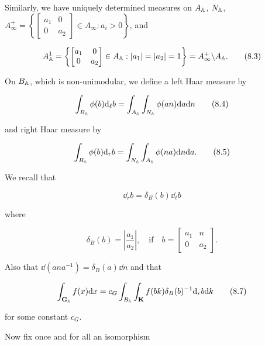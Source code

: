 Similarly, we have uniquely determined measures on $A_{\mathbb{A}}$, $N_{\mathbb{A}}$, $A_{\infty}^{+} = \left\{\begin{bmatrix} a_{1} & 0 \\ 0 & a_{2} \end{bmatrix} \in A_{\infty}: a_{i} > 0\right\}$, and

\begin{equation}\label{eq:8.3}
A_{\mathbb{A}}^{1} = \left\{\begin{bmatrix} a_{1} & 0 \\ 0 & a_{2} \end{bmatrix} \in A_{\mathbb{A}}: |a_{1}| = |a_{2}| = 1\right\} = A_{\infty}^{+}\backslash A_{\mathbb{A}}.\tag{8.3}
\end{equation}

On $B_{\mathbb{A}}$, which is non-unimodular, we define a left Haar measure by

\begin{equation}\label{eq:8.4}
\int_{B_{\mathbb{A}}} \phi(b) \mathrm{d}_{\ell} b = \int_{A_{\mathbb{A}}} \int_{N_{\mathbb{A}}} \phi(an) \mathrm{d} a \mathrm{d} n\tag{8.4}
\end{equation}

and right Haar measure by

\begin{equation}\label{eq:8.5}
\int_{B_{\mathbb{A}}} \phi(b) \mathrm{d}_{r} b = \int_{N_{\mathbb{A}}} \int_{A_{\mathbb{A}}} \phi(na) \mathrm{d} n \mathrm{d} a.\tag{8.5}
\end{equation}

We recall that

\begin{equation}\label{eq:8.6}
\dd_{r} b = \delta_{B}(b) \dd_{\ell} b\tag{8.6}
\end{equation}

where

\[
\delta_{B}(b) = \left|\frac{a_{1}}{a_{2}}\right|, \quad \text{if} \quad b = \begin{bmatrix} a_{1} & n \\ 0 & a_{2} \end{bmatrix}.
\]

Also that $\dd(ana^{-1}) = \delta_{B}(a) \dd n$ and that

\begin{equation}\label{eq:8.7}
\int_{\mathbf{G}_{\mathbb{A}}} f(x) \mathrm{d} x = c_{G} \int_{B_{\mathbb{A}}} \int_{\mathbf{K}} f(bk) \delta_{B}(b)^{-1} \mathrm{d}_{r} b \mathrm{d} k\tag{8.7}
\end{equation}

for some constant $c_{G}$.

Now fix once and for all an isomorphism

